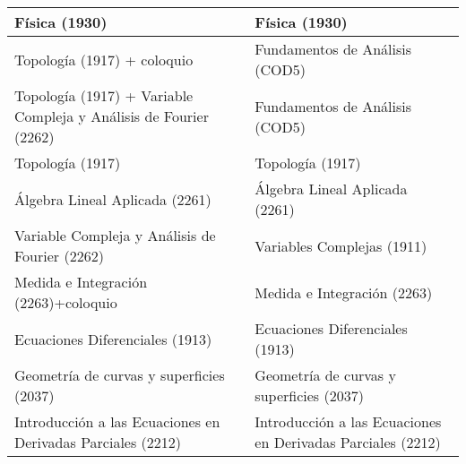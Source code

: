 \documentclass[a4paper, 12pt]{article}
\begin{document}
\begin{center}
\begin{tabularx}{1\textwidth}{|>{\raggedright\arraybackslash}X |
>{\raggedright\arraybackslash}X |}
Física          (1930)                & Física    (1930)             \\ \hline

Topología   (1917) + coloquio & Fundamentos de Análisis   (COD5)                      \\
\hline
Topología   (1917) + Variable Compleja y Análisis de Fourier (2262) & Fundamentos de Análisis   (COD5)                      \\
\hline



Topología   (1917)                &Topología   (1917)       \\
\hline

Álgebra Lineal Aplicada (2261)      & Álgebra Lineal Aplicada (2261)       \\\hline

Variable Compleja y Análisis de Fourier (2262)  & Variables Complejas (1911)               \\
\hline

Medida e Integración (2263)+coloquio   & Medida e Integración (2263) \\
\hline

Ecuaciones Diferenciales    (1913)     &Ecuaciones Diferenciales (1913)   \\
\hline

Geometría de curvas y superficies  (2037)  & Geometría de curvas y superficies  (2037)
\\\hline

Introducción a las Ecuaciones en Derivadas Parciales (2212) & 
Introducción a las Ecuaciones en Derivadas Parciales (2212)
\\\hline
\end{tabularx}
\end{center}

\normalfont
\newpage



\newpage

%



%
 
\end{document}
